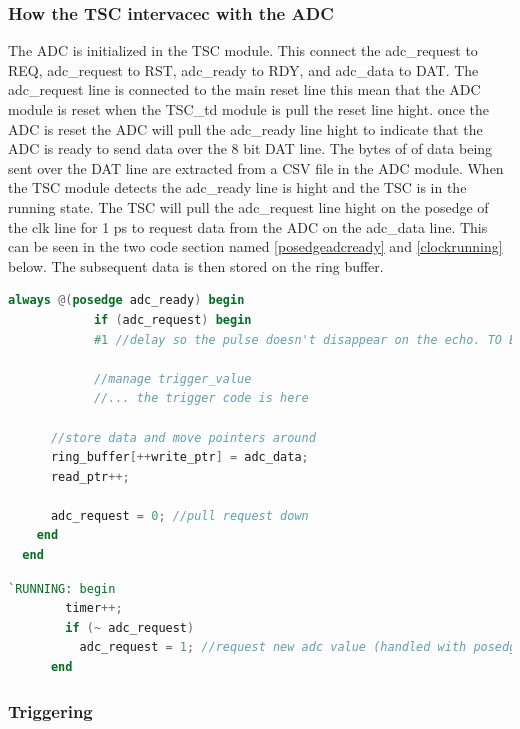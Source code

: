 \subsubsection{How the TSC intervacec with the ADC}
The ADC is initialized in the TSC module.
This connect the adc\_request to REQ, adc\_request to RST,  adc\_ready to RDY, and adc\_data to DAT.
The adc\_request line is connected to the main reset line this mean that the ADC module is reset when the TSC\_td
module is pull the reset line hight.
once the ADC is reset the ADC will pull the adc\_ready line hight to indicate that the ADC is ready to send data over the 8 bit DAT line.
The  bytes of of data being sent over the DAT line are extracted from a CSV file in the ADC module.
When the TSC module detects the adc\_ready line is hight and the TSC is in the running state.
The TSC will pull the adc\_request line hight on the posedge of the clk line for 1 ps to request data from the ADC on the adc\_data line.
This can be seen in the two code section named \ref{posedgeadcready} and \ref{clockrunning} below.
The subsequent data is then stored on the ring buffer.


\begin{lstlisting}[language=Verilog, caption={Code for storing data and moving pointers in the posedge adc\_ready}, label={posedgeadcready}]
      always @(posedge adc_ready) begin
            if (adc_request) begin
            #1 //delay so the pulse doesn't disappear on the echo. TO BE REMOVED
          
            //manage trigger_value
            //... the trigger code is here

      //store data and move pointers around
      ring_buffer[++write_ptr] = adc_data;
      read_ptr++;

      adc_request = 0; //pull request down
    end
  end
\end{lstlisting}


\begin{lstlisting}[language=Verilog, caption={Code for requesting data from the ADC on posedge of the clock when in RUNNING state}, label={clockrunning}]
      `RUNNING: begin
        timer++;
        if (~ adc_request)
          adc_request = 1; //request new adc value (handled with posedge adc_ready)
      end
\end{lstlisting}




\subsubsection{Triggering}

